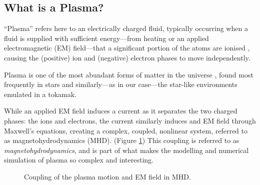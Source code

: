 \subsection*{What is a Plasma?}
    \begin{definition}[Plasma]
        ``Plasma'' refers here to an electrically charged fluid, typically occurring when a fluid is supplied with sufficient energy—from heating or an applied electromagnetic (EM) field—that a significant portion of the atoms  are ionised , causing the (positive) ion and (negative) electron phases to move independently.
    \end{definition}
    Plasma is one of the most abundant forms of matter in the universe \cite{CL13}, found most frequently in stars \cite{Phi95, Asc06, Pie17} and similarly—as in our case—the star-like environments emulated in a tokamak.
    
    While an applied EM field induces a current as it separates the two charged phases: the ions and electrons, the current similarly induces and EM field through Maxwell's equations, creating a complex, coupled, nonlinear system, referred to as magnetohydrodynamics (MHD). (Figure \ref{MHD coupling}) \BA{[Ref.]} This coupling is referred to as \emph{magnetohydrodynamics}, and is part of what makes the modelling and numerical simulation of plasma so complex and interesting.
    \begin{figure}[!h]
        \centering
        \caption{Coupling of the plasma motion and EM field in MHD.}
        \label{MHD coupling}
    \end{figure}
    